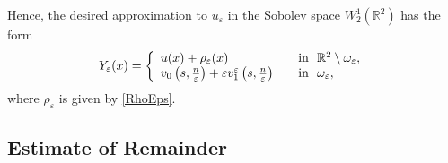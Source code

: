 \documentclass[reqno]{amsart}
\theoremstyle{plain}
\numberwithin{equation}{section}
\newcommand{\Real}{\mathbb R}
\newcommand{\eps}{\varepsilon}
\newcommand\nep{\textstyle\frac n\eps}
\begin{document}
Hence, the desired approximation to $u_\eps$ in the Sobolev space $W_2^1(\Real^2)$ has the form
\begin{equation}\label{AsymptoticsUe}
Y_\eps(x)=
\left\{
  \begin{array}{ll}
    u(x)+\rho_\eps(x)&\quad \hbox{in \ }\Real^2\setminus \omega_\eps, \\
    v_0\left(s,\nep\right)+\eps v_1^\eps\left(s,\nep\right)
&\quad \hbox{in \ } \omega_\eps,
  \end{array}
\right.
\end{equation}
where $\rho_\eps$ is given by \eqref{RhoEps}.







\subsection{Estimate of Remainder}
\end{document}
